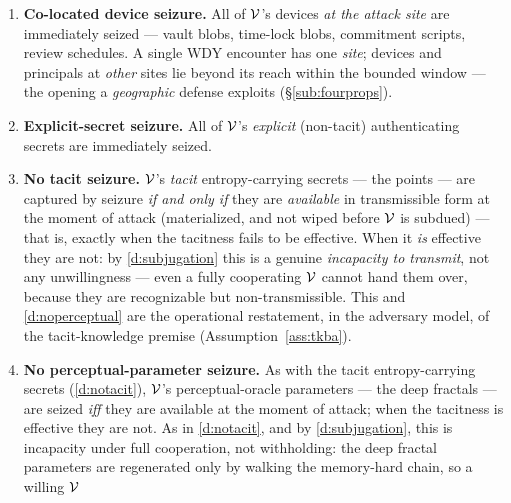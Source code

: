 \begin{assumption}
\begin{enumerate}[nosep,leftmargin=2.4em,start=0,label=\textbf{D\arabic*.},ref=D\arabic*]
        simplicity, and to make the argument \emph{a fortiori}, we assume that
        from the onset of the attack until $\Attacker$ releases $\Victim$,
        $\Attacker$ meets \emph{no resistance whatsoever} and enjoys $\Victim$'s
        \emph{full cooperation}. The sole qualification --- \emph{feigned}
        cooperation in the residual window --- is, as we argue there
        (\S\ref{sec:residual-dr}), of residual importance.
  \item\label{d:seizure} \textbf{Co-located device seizure.} All of $\Victim$'s devices \emph{at
        the attack site} are immediately seized --- vault blobs, time-lock blobs,
        commitment scripts, review schedules. A single WDY encounter has one
        \emph{site}; devices and principals at \emph{other} sites lie beyond its
        reach within the bounded window --- the opening a \emph{geographic}
        defense exploits (\S\ref{sub:fourprops}).
  \item\label{d:explicit} \textbf{Explicit-secret seizure.} All of $\Victim$'s \emph{explicit}
        (non-tacit) authenticating secrets are immediately seized.
  \item\label{d:notacit} \textbf{No tacit seizure.} $\Victim$'s \emph{tacit} entropy-carrying 
        secrets --- the points --- are captured by seizure \emph{if and only if} they are
        \emph{available} in transmissible form at the moment of attack (materialized,
        and not wiped before $\Victim$ is subdued) --- that is, exactly when the
        tacitness fails to be effective. When it \emph{is} effective they are not:
        by \ref{d:subjugation} this is a genuine \emph{incapacity to transmit}, not
        any unwillingness --- even a fully cooperating $\Victim$ cannot hand them
        over, because they are recognizable but non-transmissible. This and
        \ref{d:noperceptual} are the operational restatement, in the adversary
        model, of the tacit-knowledge premise (Assumption~\ref{ass:tkba}).
  \item\label{d:noperceptual} \textbf{No perceptual-parameter seizure.} As with
        the tacit entropy-carrying secrets (\ref{d:notacit}), $\Victim$'s
        perceptual-oracle parameters --- the deep fractals --- are seized \emph{iff}
        they are available at the moment of attack; when the tacitness is effective 
        they are not. As in \ref{d:notacit}, and by \ref{d:subjugation}, this is 
        incapacity under full cooperation, not withholding: the deep fractal parameters 
        are regenerated only by walking the memory-hard chain, so a willing $\Victim$ 

\end{enumerate}
\end{assumption}
